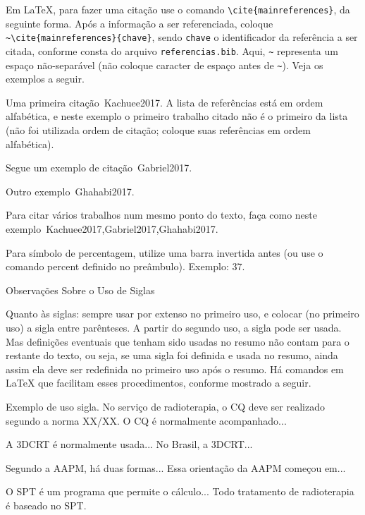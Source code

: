 \documentclass[a4paper, 12pt]{ppgeb}
\makeatletter
\renewcommand{\section}{\@startsection
{section}
{1}
{0mm}
{-\baselineskip}
{0.5\baselineskip}
{\large\bfseries\scshape}}
\newcommand{\percentagesignscale}{0.8}
\newcommand{\percent}{\scalebox{\percentagesignscale}{~\%}}
\makeatother
\begin{document}
Em LaTeX, para fazer uma citação use o comando \verb|\cite{mainreferences}|, da seguinte forma. Após a informação a ser referenciada, coloque \verb|~\cite{mainreferences}{chave}|, sendo \verb|chave| o identificador da referência a ser citada, conforme consta do arquivo \verb|referencias.bib|. Aqui, \verb|~| representa um espaço não-separável (não coloque caracter de espaço antes de \verb|~|). Veja os exemplos a seguir.

Uma primeira citação~\cite{mainreferences}{Kachuee2017}. A lista de referências está em ordem alfabética, e neste exemplo o primeiro trabalho citado não é o primeiro da lista (não foi utilizada ordem de citação; coloque suas referências em ordem alfabética).

Segue um exemplo de citação~\cite{mainreferences}{Gabriel2017}.

Outro exemplo~\cite{mainreferences}{Ghahabi2017}.

Para citar vários trabalhos num mesmo ponto do texto, faça como neste exemplo~\cite{mainreferences}{Kachuee2017,Gabriel2017,Ghahabi2017}.

Para símbolo de percentagem, utilize uma barra invertida antes (ou use o comando percent definido no preâmbulo). Exemplo: 37\percent.

\section{Observações Sobre o Uso de Siglas}

Quanto às siglas: sempre usar por extenso no primeiro uso, e colocar (no primeiro uso) a sigla entre parênteses. A partir do segundo uso, a sigla pode ser usada. Mas definições eventuais que tenham sido usadas no resumo não contam para o restante do texto, ou seja, se uma sigla foi definida e usada no resumo, ainda assim ela deve ser redefinida no primeiro uso após o resumo. Há comandos em LaTeX que facilitam esses procedimentos, conforme mostrado a seguir.

Exemplo de uso sigla. No serviço de radioterapia, o \ac{CQ} deve ser realizado segundo a norma XX/XX. O \ac{CQ} é normalmente acompanhado... 

A \ac{3DCRT} é normalmente usada... No Brasil, a \ac{3DCRT}...

Segundo a \ac{AAPM}, há duas formas... Essa orientação da \ac{AAPM} começou em...

O \ac{SPT} é um programa que permite o cálculo... Todo tratamento de radioterapia é baseado no \ac{SPT}.
\end{document}
